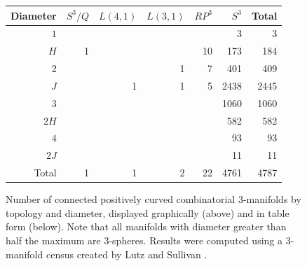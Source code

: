 \documentclass[12pt]{article}
\begin{document}
\begin{figure}
    \begin{center}
    {
	    \setlength\fboxsep{15pt}
		\setlength\fboxrule{0pt}
    }
    	\renewcommand{\arraystretch}{1.2}
    \begin{tabular} {| r | r | r | r | r | r | r |}
		\hline
		Diameter & $S^{3}/Q$ & $L(4,1)$ & $L(3,1)$ & $RP^{3}$ & $S^{3}$ & Total \\
		\hline
		\hline
		$1$&  &  &  &   &3    & 3    \\
		$H$&1 &  &  &10 &173  & 184  \\
		$2$&  &  &1 &7  &401  & 409  \\
		$J$&  &1 &1 &5  &2438 & 2445 \\
		$3$&  &  &  &   &1060 & 1060 \\
		$2H$&  &  &  &   &582  & 582  \\
		$4$&  &  &  &   &93   & 93   \\
		$2J$&  &  &  &   &11   & 11   \\
		\hline
		Total&1 &1 &2 &22   &4761   &4787  \\
		\hline
	\end{tabular}
    \end{center}
    \caption{Number of connected positively curved combinatorial 3-manifolds by topology and diameter, displayed graphically (above) and in table form (below). Note that all manifolds with diameter greater than half the maximum are 3-spheres. Results were computed using a 3-manifold census created by Lutz and Sullivan \cite{LutzSul_unpub}.}
    \label{fig:type_statistics}
\end{figure}
\end{document}

